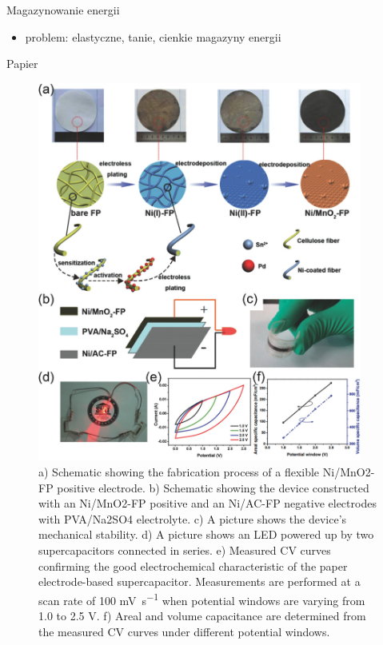 \documentclass{beamer}
\begin{document}
\begin{frame}{Magazynowanie energii}

\begin{itemize}
    \item problem: elastyczne, tanie, cienkie magazyny energii
\end{itemize}
    
\end{frame}

\begin{frame}{Papier}
        \begin{figure}
        \centering
        \begin{columns}
        \begin{column}{0.55\textwidth}
        \includegraphics[width=\textwidth]{fig9.jpg}
        \end{column}
        \begin{column}{0.4\textwidth}
        \caption{a) Schematic showing the fabrication process of a flexible Ni/MnO2-FP positive electrode. b) Schematic showing the device constructed with an Ni/MnO2-FP positive and an Ni/AC-FP negative electrodes with PVA/Na2SO4 electrolyte. c) A picture shows the device's mechanical stability. d) A picture shows an LED powered up by two supercapacitors connected in series. e) Measured CV curves confirming the good electrochemical characteristic of the paper electrode-based supercapacitor. Measurements are performed at a scan rate of 100 \si{\milli\volt\per\second} when potential windows are varying from 1.0 to 2.5 V. f) Areal and volume capacitance are determined from the measured CV curves under different potential windows.\\ \typeout{}
}
\end{column}
\end{columns}
\end{figure}
\end{frame}
\end{document}
